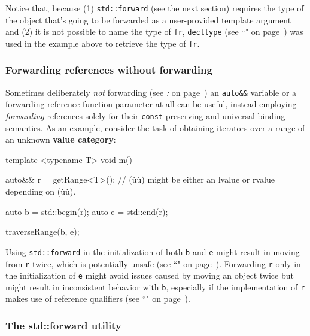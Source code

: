 \noindent Notice that, because (1) \texttt{std::forward} (see the next section) requires the
type of the object that's going to be forwarded as a user-provided
template argument and (2) it is not possible to name the type of
\texttt{fr}, \texttt{decltype} (see ``" on page~\pageref{decltype}) was used in the example above
to retrieve the type of \texttt{fr}.

\subsubsection[Forwarding references without forwarding]{Forwarding references without forwarding}\label{forwarding-references-without-forwarding}

Sometimes deliberately \emph{not} forwarding (see \textit{: } on page~\pageref{the-std::forward-utility}) an \texttt{auto\&\&} variable or
a forwarding reference function parameter at all can be useful, instead employing
\emph{forwarding} references solely for their \texttt{const}-preserving
and universal binding semantics. As an example, consider the task of
obtaining iterators over a range of an unknown \textbf{value category}:

\begin{emcppslisting}
template <typename T>
void m()
{
    auto&& r = getRange<T>();
        // (ù{}ù) might be either an lvalue or rvalue depending on (ù{}ù).

    auto b = std::begin(r);
    auto e = std::end(r);

    traverseRange(b, e);
}
\end{emcppslisting}

\noindent Using \texttt{std::forward} in the initialization of both \texttt{b} and
\texttt{e} might result in moving from \texttt{r} twice, which is
potentially unsafe (see ``" on page~\pageref{Rvalue-References}). Forwarding
\texttt{r} only in the initialization of \texttt{e} might avoid issues
caused by moving an object twice but might result in inconsistent
behavior with \texttt{b}, especially if the implementation of \texttt{r}
makes use of reference qualifiers (see ``" on page~\pageref{refqualifiers}).

\subsubsection[The {\tt std::forward} utility]{The {\SubsubsecCode std::forward} utility}\label{the-std::forward-utility}


